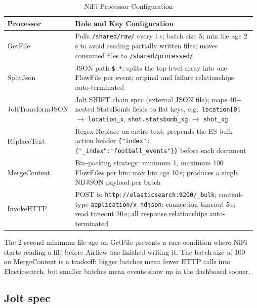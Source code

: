 \documentclass[conference]{IEEEtran}
\begin{document}
\begin{table}[ht]
\caption{NiFi Processor Configuration}
\label{tab:nifi}
\renewcommand{\arraystretch}{1.1}
\begin{tabular}{@{}p{2.0cm}p{5.3cm}@{}}
\toprule
\textbf{Processor} & \textbf{Role and Key Configuration} \\
\midrule
GetFile & Polls \texttt{/shared/raw/} every 1\,s; batch size 5; min file age
          2\,s to avoid reading partially written files; moves consumed files to
          \texttt{/shared/processed/} \\[3pt]
SplitJson & JSON path \texttt{\$.*}; splits the top-level array into one
            FlowFile per event; original and failure relationships
            auto-terminated \\[3pt]
JoltTransformJSON & Jolt SHIFT chain spec (external JSON file); maps 40+
                    nested StatsBomb fields to flat keys, e.g.\ \texttt{location[0]}
                    $\rightarrow$ \texttt{location\_x},
                    \texttt{shot.statsbomb\_xg} $\rightarrow$ \texttt{shot\_xg} \\[3pt]
ReplaceText & Regex Replace on entire text; prepends the ES bulk action header
              \texttt{\{"index":\{"\_index":"football\_events"\}\}} before each
              document \\[3pt]
MergeContent & Bin-packing strategy; minimum 1, maximum 100 FlowFiles per bin;
               max bin age 10\,s; produces a single NDJSON payload per batch \\[3pt]
InvokeHTTP & POST to \texttt{http://elasticsearch:9200/\_bulk}; content-type
             \texttt{application/x-ndjson}; connection timeout 5\,s; read
             timeout 30\,s; all response relationships auto-terminated \\
\bottomrule
\end{tabular}
\end{table}

The 2-second minimum file age on GetFile prevents a race condition where NiFi
starts reading a file before Airflow has finished writing it. The batch size
of 100 on MergeContent is a tradeoff: bigger batches mean fewer HTTP calls
into Elasticsearch, but smaller batches mean events show up in the dashboard
sooner.

\subsection{Jolt spec}
\end{document}
